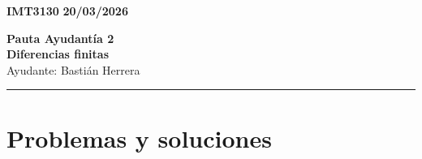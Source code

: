 \documentclass[11pt]{article}
\begin{document}
    \begin{flushleft}
        \small
        \vspace{1pt}
        \textbf{IMT3130} \hfill
        \textbf{20/03/2026}
    \end{flushleft}
    \begin{center}
        \LARGE\textbf{Pauta Ayudantía 2}\\
        \vspace{3pt}
        \normalsize\textbf{Diferencias finitas}\\
        \normalsize Ayudante: Bastián Herrera 
        \rule{\textwidth}{0.05mm}
    \end{center}

\section*{Problemas y soluciones}
\end{document}

